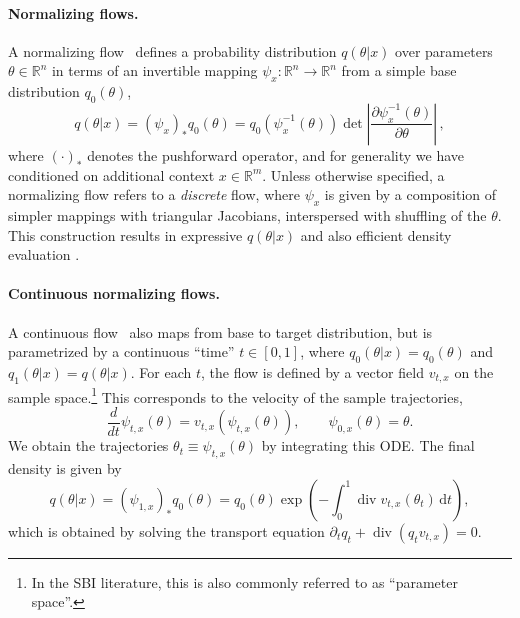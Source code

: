 \documentclass{article}
\theoremstyle{remark}
\DeclareMathOperator{\Div}{div}
\begin{document}
\paragraph{Normalizing flows.} A normalizing flow~\cite{rezende2015variational,papamakarios2019normalizing} defines a probability distribution $q(\theta|x)$ over parameters $\theta \in \mathbb{R}^n$ in terms of an invertible mapping $\psi_x: \mathbb{R}^n \to \mathbb{R}^n$ from a simple base distribution $q_0(\theta)$,
\begin{equation}\label{eq:normalizing-flow}
  q(\theta | x) = (\psi_x)_\ast q_0(\theta) = q_0( \psi_x^{-1}(\theta)) \det \left| \frac{\partial \psi_x^{-1}(\theta)}{\partial \theta} \right|\,,
\end{equation}
where $(\cdot)_\ast$ denotes the pushforward operator, and for generality we have conditioned on additional context $x \in \mathbb{R}^m$. Unless otherwise specified, a normalizing flow refers to a \emph{discrete} flow, where $\psi_x$ is given by a composition of simpler mappings with triangular Jacobians, interspersed with shuffling of the $\theta$. This construction results in expressive $q(\theta|x)$ and also efficient density evaluation \cite{papamakarios2019normalizing}. %


\paragraph{Continuous normalizing flows.} A continuous flow~\cite{neural_ode} also maps from base to target distribution, but is parametrized by a continuous ``time'' $t \in [0,1]$, where $q_0(\theta|x) = q_0(\theta)$ and $q_1(\theta|x) = q(\theta|x)$. For each $t$, the flow is defined by a vector field $v_{t,x}$ on the sample space.\footnote{In the SBI literature, this is also commonly referred to as ``parameter space''.} This corresponds to the velocity of the sample trajectories,
\begin{equation}\label{eq:ODE}
  \frac{d}{dt} \psi_{t, x} (\theta) = v_{t, x}(\psi_{t, x}(\theta)),\qquad \psi_{0, x} (\theta) = \theta.
\end{equation}
We obtain the trajectories $\theta_t \equiv \psi_{t,x}(\theta)$ by integrating this ODE. The final density is given by
\begin{equation}\label{eq:cnf-density}
  q(\theta|x) = (\psi_{1, x})_\ast q_0(\theta) = q_0(\theta) \exp\left( - \int_0^1 \Div v_{t,x} (\theta_t) \,\mathrm{d} t \right),
\end{equation}
which is obtained by solving the transport equation $\partial_t q_t + \Div(q_t v_{t,x}) = 0$.
\end{document}
